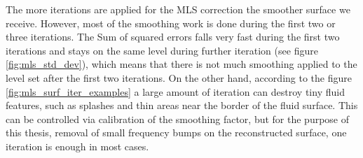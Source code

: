 The more iterations are applied for the MLS correction the smoother surface we receive. However, most of the smoothing work is done during the first two or three iterations. The Sum of squared errors falls very fast during the first two iterations and stays on the same level during further iteration (see figure \ref{fig:mls_std_dev}), which means that there is not much smoothing applied to the level set after the first two iterations. On the other hand, according to the figure \ref{fig:mls_surf_iter_examples} a large amount of iteration can destroy tiny fluid features, such as splashes and thin areas near the border of the fluid surface. This can be controlled via calibration of the smoothing factor, but for the purpose of this thesis, removal of small frequency bumps on the reconstructed surface, one iteration is enough in most cases.

